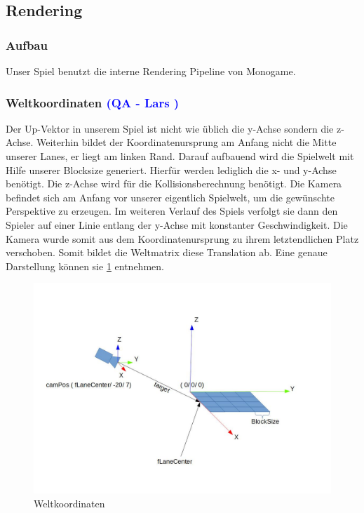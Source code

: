 \documentclass[12pt]{article}
\begin{document}
\vspace{2cm}
\subsection{Rendering}

\vspace{1cm}
\subsubsection{Aufbau}

Unser Spiel benutzt die interne Rendering Pipeline von Monogame.

\vspace{1cm}
\subsubsection{Weltkoordinaten \textcolor{blue}{(QA - Lars )}}

Der Up-Vektor in unserem Spiel ist nicht wie üblich die y-Achse sondern die z-Achse. Weiterhin bildet der Koordinatenursprung am 
Anfang nicht die Mitte unserer Lanes, er liegt am linken Rand. Darauf aufbauend wird die Spielwelt mit Hilfe unserer Blocksize generiert. Hierfür 
werden lediglich die x- und y-Achse benötigt. Die z-Achse wird für die Kollisionsberechnung benötigt. Die Kamera befindet sich am Anfang 
vor unserer eigentlich Spielwelt, um die gewünschte Perspektive zu erzeugen. Im weiteren Verlauf des Spiels verfolgt sie dann den Spieler
auf einer Linie entlang der y-Achse mit konstanter Geschwindigkeit. Die Kamera wurde somit aus dem Koordinatenursprung zu ihrem letztendlichen
Platz verschoben. Somit bildet die Weltmatrix diese Translation ab. Eine genaue Darstellung können sie \ref{fig:coordinates} entnehmen.

\begin{figure}
	\centering
	\includegraphics[width=1\textwidth]{Weltkoordinaten}
	\caption{Weltkoordinaten
		\label{fig:coordinates}}
\end{figure}
\end{document}
